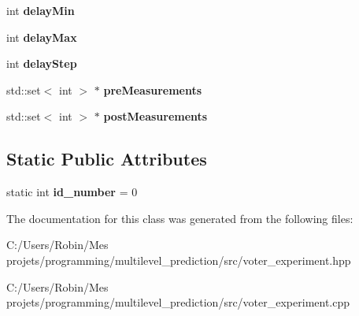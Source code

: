 \begin{DoxyCompactItemize}
\item 
\hypertarget{class_voter_experiment_a65edc09b6f6077cd29739e8f93c46246}{}int {\bfseries delay\+Min}\label{class_voter_experiment_a65edc09b6f6077cd29739e8f93c46246}

\item 
\hypertarget{class_voter_experiment_a1556d0e6c7c1590a8ba3604806738b51}{}int {\bfseries delay\+Max}\label{class_voter_experiment_a1556d0e6c7c1590a8ba3604806738b51}

\item 
\hypertarget{class_voter_experiment_a1c95cd8bdfefbcb1c51560f2b9fc5b85}{}int {\bfseries delay\+Step}\label{class_voter_experiment_a1c95cd8bdfefbcb1c51560f2b9fc5b85}

\item 
\hypertarget{class_voter_experiment_af81685b5c3ac3a351294323fbf1bf4e4}{}std\+::set$<$ int $>$ $\ast$ {\bfseries pre\+Measurements}\label{class_voter_experiment_af81685b5c3ac3a351294323fbf1bf4e4}

\item 
\hypertarget{class_voter_experiment_a0f8a4f7cdec84828dc4e3bf657e75675}{}std\+::set$<$ int $>$ $\ast$ {\bfseries post\+Measurements}\label{class_voter_experiment_a0f8a4f7cdec84828dc4e3bf657e75675}

\end{DoxyCompactItemize}
\subsection*{Static Public Attributes}
\begin{DoxyCompactItemize}
\item 
\hypertarget{class_voter_experiment_a551fa2b6c0dcce621a4e8e552cbb11ff}{}static int {\bfseries id\+\_\+number} = 0\label{class_voter_experiment_a551fa2b6c0dcce621a4e8e552cbb11ff}

\end{DoxyCompactItemize}


The documentation for this class was generated from the following files\+:\begin{DoxyCompactItemize}
\item 
C\+:/\+Users/\+Robin/\+Mes projets/programming/multilevel\+\_\+prediction/src/voter\+\_\+experiment.\+hpp\item 
C\+:/\+Users/\+Robin/\+Mes projets/programming/multilevel\+\_\+prediction/src/voter\+\_\+experiment.\+cpp\end{DoxyCompactItemize}
